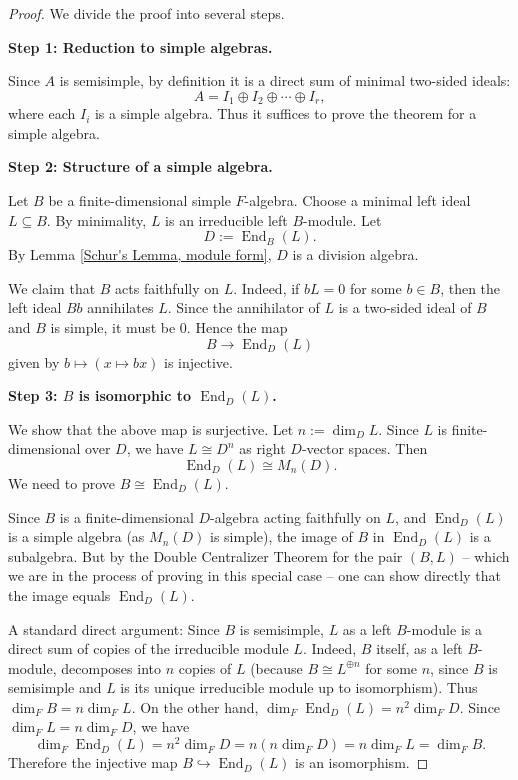\begin{proof}
We divide the proof into several steps.

\medskip
\noindent\textbf{Step 1: Reduction to simple algebras.}

Since $A$ is semisimple, by definition it is a direct sum of minimal two-sided ideals:
\[
A = I_1 \oplus I_2 \oplus \cdots \oplus I_r,
\]
where each $I_i$ is a simple algebra. Thus it suffices to prove the theorem for a simple algebra.

\medskip
\noindent\textbf{Step 2: Structure of a simple algebra.}

Let $B$ be a finite-dimensional simple $F$-algebra. Choose a minimal left ideal $L \subseteq B$. By minimality, $L$ is an irreducible left $B$-module. Let
\[
D := \operatorname{End}_B(L).
\]
By Lemma \ref{Schur's Lemma, module form}, $D$ is a division algebra.

We claim that $B$ acts faithfully on $L$. Indeed, if $bL=0$ for some $b\in B$, then the left ideal $Bb$ annihilates $L$. Since the annihilator of $L$ is a two-sided ideal of $B$ and $B$ is simple, it must be $0$. Hence the map
\[
B \longrightarrow \operatorname{End}_D(L)
\]
given by $b \mapsto (x \mapsto bx)$ is injective.

\medskip
\noindent\textbf{Step 3: $B$ is isomorphic to $\operatorname{End}_D(L)$.}

We show that the above map is surjective. Let $n := \dim_D L$. Since $L$ is finite-dimensional over $D$, we have $L \cong D^n$ as right $D$-vector spaces. Then
\[
\operatorname{End}_D(L) \cong M_n(D).
\]
We need to prove $B \cong \operatorname{End}_D(L)$.

Since $B$ is a finite-dimensional $D$-algebra acting faithfully on $L$, and $\operatorname{End}_D(L)$ is a simple algebra (as $M_n(D)$ is simple), the image of $B$ in $\operatorname{End}_D(L)$ is a subalgebra. But by the Double Centralizer Theorem for the pair $(B,L)$ -- which we are in the process of proving in this special case -- one can show directly that the image equals $\operatorname{End}_D(L)$.

A standard direct argument: Since $B$ is semisimple, $L$ as a left $B$-module is a direct sum of copies of the irreducible module $L$. Indeed, $B$ itself, as a left $B$-module, decomposes into $n$ copies of $L$ (because $B \cong L^{\oplus n}$ for some $n$, since $B$ is semisimple and $L$ is its unique irreducible module up to isomorphism). Thus $\dim_F B = n \dim_F L$. On the other hand, $\dim_F \operatorname{End}_D(L) = n^2 \dim_F D$. Since $\dim_F L = n \dim_F D$, we have
\[
\dim_F \operatorname{End}_D(L) = n^2 \dim_F D = n (n \dim_F D) = n \dim_F L = \dim_F B.
\]
Therefore the injective map $B \hookrightarrow \operatorname{End}_D(L)$ is an isomorphism.


\end{proof}
